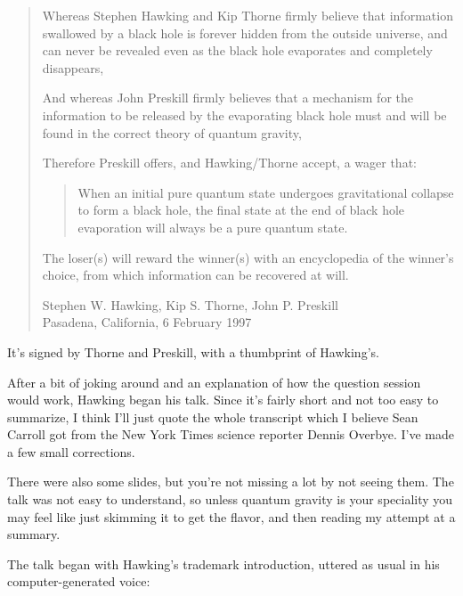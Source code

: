 \documentclass{article}
\begin{document}
\begin{quote}
Whereas Stephen Hawking and Kip Thorne firmly believe that information
swallowed by a black hole is forever hidden from the outside universe,
and can never be revealed even as the black hole evaporates and
completely disappears,

And whereas John Preskill firmly believes that a mechanism for the
information to be released by the evaporating black hole must and will
be found in the correct theory of quantum gravity,

Therefore Preskill offers, and Hawking/Thorne accept, a wager that:

\begin{quote}
When an initial pure quantum state undergoes gravitational collapse to
form a black hole, the final state at the end of black hole evaporation
will always be a pure quantum state.
\end{quote}

The loser(s) will reward the winner(s) with an encyclopedia of the
winner's choice, from which information can be recovered at will.

Stephen W. Hawking, Kip S. Thorne, John P. Preskill\\
Pasadena, California, 6 February 1997
\end{quote}

It's signed by Thorne and Preskill, with a thumbprint of Hawking's.

After a bit of joking around and an explanation of how the question
session would work, Hawking began his talk. Since it's fairly short and
not too easy to summarize, I think I'll just quote the whole transcript
which I believe Sean Carroll got from the New York Times science
reporter Dennis Overbye. I've made a few small corrections.

There were also some slides, but you're not missing a lot by not seeing
them. The talk was not easy to understand, so unless quantum gravity is
your speciality you may feel like just skimming it to get the flavor,
and then reading my attempt at a summary.

The talk began with Hawking's trademark introduction, uttered as usual
in his computer-generated voice:
\end{document}
